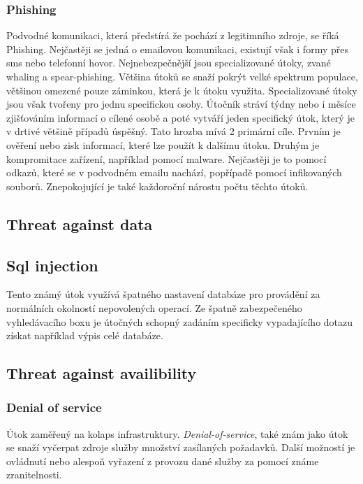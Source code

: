 \subsubsection{Phishing}
Podvodné komunikaci, která předstírá že pochází z legitimního zdroje, se říká Phishing\cite{cisco_most_common_attack}.
Nejčastěji se jedná o emailovou komunikaci, existují však i formy přes sms nebo telefonní hovor.
Nejnebezpečnější jsou specializované útoky, zvané whaling a spear-phishing.
Většina útoků se snaží pokrýt velké spektrum populace, většinou omezené pouze záminkou, která je k útoku využita.
Specializované útoky jsou však tvořeny pro jednu specifickou osoby.
Útočník stráví týdny nebo i měsíce zjišťováním informací o cílené osobě a poté vytváří jeden specifický útok, který je v drtivé většině případů úspěšný.
Tato hrozba mívá 2 primární cíle.
Prvním je ověření nebo zisk informací, které lze použít k dalšímu útoku.
Druhým je kompromitace zařízení, například pomocí malware.
Nejčastěji je to pomocí odkazů, které se v podvodném emailu nachází, popřípadě pomocí infikovaných souborů.
Znepokojující je také každoroční nárostu počtu těchto útoků.\cite{moje_bakalarka}




\subsection{Threat against data}

\subsection{Sql injection}
Tento známý útok využívá špatného nastavení databáze pro provádění za normálních okolností nepovolených operací.
Ze špatně zabezpečeného vyhledávacího boxu je útočných schopný zadáním specificky vypadajícího dotazu získat například výpis celé databáze.

\subsection{Threat against availibility}

\subsubsection{Denial of service}
Útok zaměřený na kolaps infrastruktury.
\textit{Denial-of-service}, také znám jako  útok se snaží vyčerpat zdroje služby množství zasílaných požadavků.
Další možností je ovládnutí nebo alespoň vyřazení z provozu dané služby za pomocí známe zranitelnosti.\cite{cisco_most_common_attack}


